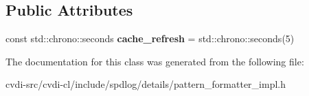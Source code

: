 \subsection*{Public Attributes}
\begin{DoxyCompactItemize}
\item 
const std\+::chrono\+::seconds {\bfseries cache\+\_\+refresh} = std\+::chrono\+::seconds(5)\hypertarget{classspdlog_1_1details_1_1SPDLOG__FINAL_a17d00a6bd1386e0d256e147048c342ae}{}\label{classspdlog_1_1details_1_1SPDLOG__FINAL_a17d00a6bd1386e0d256e147048c342ae}

\end{DoxyCompactItemize}


The documentation for this class was generated from the following file\+:\begin{DoxyCompactItemize}
\item 
cvdi-\/src/cvdi-\/cl/include/spdlog/details/pattern\+\_\+formatter\+\_\+impl.\+h\end{DoxyCompactItemize}
